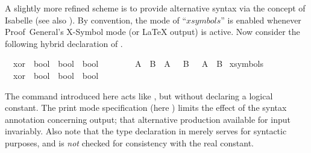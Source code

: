 \begin{isabellebody}
\begin{isamarkuptext}
  \medskip A slightly more refined scheme is to provide alternative
  syntax via the  concept of Isabelle (see also
  \cite{isabelle-ref}).  By convention, the mode of ``$xsymbols$'' is
  enabled whenever Proof~General's X-Symbol mode (or {\LaTeX} output)
  is active.  Now consider the following hybrid declaration of .%
\end{isamarkuptext}%
\isamarkuptrue%
\isamarkupfalse%
\isamarkupfalse%
\isanewline
\ \ xor\ {\isacharcolon}{\isacharcolon}\ {\isachardoublequote}bool\ {\isasymRightarrow}\ bool\ {\isasymRightarrow}\ bool{\isachardoublequote}\ \ \ \ {\isacharparenleft}\ {\isachardoublequote}{\isacharbrackleft}{\isacharplus}{\isacharbrackright}{\isasymignore}{\isachardoublequote}\ {}{}{\isacharparenright}\isanewline
\ \ {\isachardoublequote}A\ {\isacharbrackleft}{\isacharplus}{\isacharbrackright}{\isasymignore}\ B\ {\isasymequiv}\ {\isacharparenleft}A\ {\isasymand}\ {\isasymnot}\ B{\isacharparenright}\ {\isasymor}\ {\isacharparenleft}{\isasymnot}\ A\ {\isasymand}\ B{\isacharparenright}{\isachardoublequote}\isanewline
\isanewline
\isamarkupfalse%
\ {\isacharparenleft}xsymbols{\isacharparenright}\isanewline
\ \ xor\ {\isacharcolon}{\isacharcolon}\ {\isachardoublequote}bool\ {\isasymRightarrow}\ bool\ {\isasymRightarrow}\ bool{\isachardoublequote}\ \ \ \ {\isacharparenleft}\ {\isachardoublequote}{\isasymoplus}{\isasymignore}{\isachardoublequote}\ {}{}{\isacharparenright}\isamarkupfalse%
\isamarkupfalse%
%
\begin{isamarkuptext}%
The  command introduced here acts like
  , but without declaring a logical constant.  The
  print mode specification (here ) limits the
  effect of the syntax annotation concerning output; that alternative
  production available for input invariably.  Also note that the type
  declaration in  merely serves for syntactic
  purposes, and is \emph{not} checked for consistency with the real
  constant.


\end{isamarkuptext}
\end{isabellebody}
